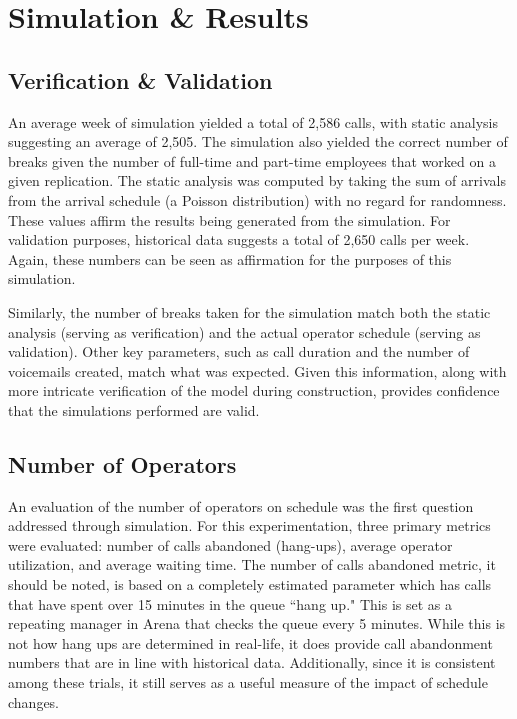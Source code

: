 \documentclass[12pt]{article}
\begin{document}
\section{Simulation \& Results}

	\subsection{Verification \& Validation}
	
	  An average week of simulation yielded a total of 2,586 calls, with static analysis suggesting an average of 2,505.  The simulation also yielded the correct number of breaks given the number of full-time and part-time employees that worked on a given replication.  The static analysis was computed by taking the sum of arrivals from the arrival schedule (a Poisson distribution) with no regard for randomness.  These values affirm the results being generated from the simulation.  For validation purposes, historical data suggests a total of 2,650 calls per week.  Again, these numbers can be seen as affirmation for the purposes of this simulation.
	  
	  \par
	  
	  Similarly, the number of breaks taken for the simulation match both the static analysis (serving as verification) and the actual operator schedule (serving as validation).  Other key parameters, such as call duration and the number of voicemails created, match what was expected.  Given this information, along with more intricate verification of the model during construction, provides confidence that the simulations performed are valid.
	  
	  
	\subsection{Number of Operators}
	
	An evaluation of the number of operators on schedule was the first question addressed through simulation.  For this experimentation, three primary metrics were evaluated:  number of calls abandoned (hang-ups), average operator utilization, and average waiting time.  The number of calls abandoned metric, it should be noted, is based on a completely estimated parameter which has calls that have spent over 15 minutes in the queue ``hang up."  This is set as a repeating manager in Arena that checks the queue every 5 minutes.  While this is not how hang ups are determined in real-life, it does provide call abandonment numbers that are in line with historical data.  Additionally, since it is consistent among these trials, it still serves as a useful measure of the impact of schedule changes.
	
\end{document}
